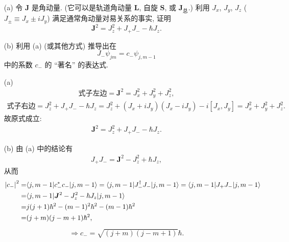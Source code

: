 \documentclass{assignment}
\begin{document}
\begin{prob}[课本习题 3.15]
    \begin{itemize}
        \item[(a)] 令 $\bm{J}$ 是角动量. (它可以是轨道角动量 $\bm{L}$, 自旋 $\bm{S}$, 或 $\bm{J}_{\text{总}}$.) 利用 $J_x$, $J_y$, $J_z$ ($J_{\pm}\equiv J_x\pm iJ_y$) 满足通常角动量对易关系的事实, 证明
        \[
            \bm{J}^2=J_z^2+J_+J_--\hbar J_z.
        \]
        \item[(b)] 利用 (a) (或其他方式) 推导出在
        \[
            J_-\psi_{jm}=c_-\psi_{j,m-1}
        \]
        中的系数 $c_-$ 的 ``著名'' 的表达式.
    \end{itemize}
\end{prob}
\begin{pf}
    \begin{itemize}
        \item[(a)] 
        \begin{align}
            \text{式子左边}=\bm{J}^2=J_x^2+J_y^2+J_z^2,
        \end{align}
        \begin{align}
            \text{式子右边}=J_z^2+J_+J_--\hbar J_z=J_z^2+(J_x+iJ_y)(J_x-iJ_y)-i[J_x,J_y]=J_x^2+J_y^2+J_z^2.
        \end{align}
        故原式成立:
        \begin{align}
            \bm{J}^2=J_z^2+J_+J_--\hbar J_z.
        \end{align}
        \item[(b)] 由 (a) 中的结论有
        \begin{align}
            J_+J_-=\bm{J}^2-J_z^2+\hbar J_z,
        \end{align}
        从而
        \begin{align}
            \notag\left\lvert c_-\right\rvert^2=&\langle j,m-1\rvert c_-^*c_-\lvert j,m-1\rangle=\langle j,m-1\rvert J_-^{\dagger}J_-\lvert j,m-1\rangle=\langle j,m-1\rvert J_+J_-\lvert j,m-1\rangle\\
            \notag=&\langle j,m-1\rvert\bm{J}^2-J_z^2-\hbar J_z\lvert j,m-1\rangle\\
            \notag=&j(j+1)\hbar^2-(m-1)^2\hbar^2-(m-1)\hbar^2\\
            =&(j+m)(j-m+1)\hbar^2,
        \end{align}
        \begin{align}
            \Longrightarrow c_-=\sqrt{(j+m)(j-m+1)}\hbar.
        \end{align}
    \end{itemize}
\end{pf}
\end{document}
